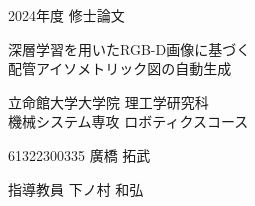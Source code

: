 \begin{titlepage}
  \centering
  \vspace*{2cm}
  
  {\Large 2024年度 修士論文}
  
    \vspace{2cm}
  {\LARGE 深層学習を用いたRGB-D画像に基づく}\\
  {\LARGE 配管アイソメトリック図の自動生成}
  
  \vfill
  \vspace{5cm}

  {\Large 立命館大学大学院 理工学研究科}\\
  \vspace{0.5cm}
  {\Large 機械システム専攻 ロボティクスコース}
  \vspace{0.5cm}

  
  {\Large 61322300335 廣橋 拓武}
  
  \vspace{3cm}
  
  {\Large 指導教員 下ノ村 和弘}
  
  \vfill
  
  \vspace{1cm}
  
\end{titlepage}